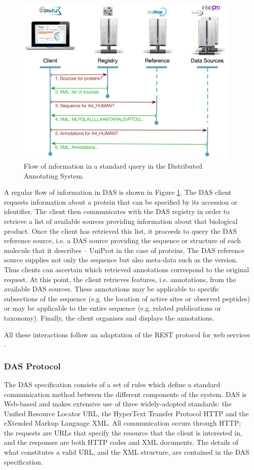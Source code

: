 \begin{figure}  
\centering
\includegraphics[width=4.3in]{figures/DAS.png}
\caption[DAS Flow of Information.]{Flow of information in a standard query in the Distributed Annotating System.
\label{fig:das}}
\end{figure}

A regular flow of information in DAS is shown in Figure \ref{fig:das}. The DAS client requests information about a protein that can be specified by its accession or identifier. The client then communicates with the DAS registry in order to retrieve a list of available sources providing information about that biological product. Once the client has retrieved this list, it proceeds to query the DAS reference source, i.e. a DAS source providing the sequence or structure of each molecule that it describes -- UniProt in the case of proteins. The DAS reference source supplies not only the sequence but also meta-data such as the version. Thus clients can ascertain which retrieved annotations correspond to the original request. At this point, the client retrieves features, i.e. annotations, from the available DAS sources. These annotations may be applicable to specific subsections of the sequence (e.g. the location of active sites or observed peptides) or may be applicable to the entire sequence (e.g. related publications or taxonomy). Finally, the client organises and displays the annotations. 

All these interactions follow an adaptation of the REST protocol for web services\cite{PRL2007} .

\subsubsection{DAS Protocol}
\label{ssec:DASprotocol}
The DAS specification consists of a set of rules which define a standard communication method between the different components of the system. DAS is Web-based and makes extensive use of three widely-adopted standards: the Unified Resource Locator URL, the HyperText Transfer Protocol HTTP and the eXtended Markup Language XML. All communication occurs through HTTP; the requests are URLs that specify the resource that the client is interested in, and the responses are both HTTP codes and XML documents. The details of what constitutes a valid URL, and the XML structure, are contained in the DAS specification.

